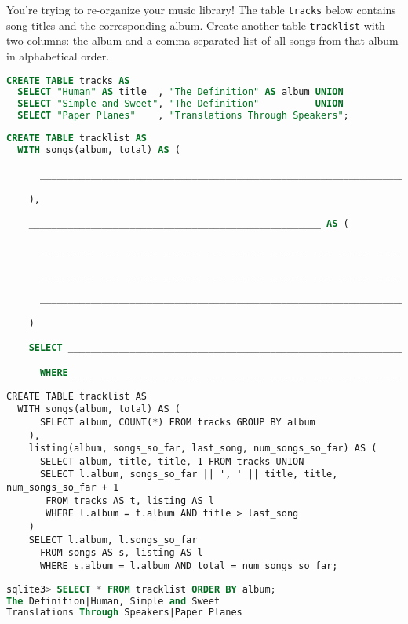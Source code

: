 \question You're trying to re-organize your music library! The table
\texttt{tracks} below contains song titles and the corresponding album.
Create another table \texttt{tracklist} with two columns: the album and a
comma-separated list of all songs from that album in alphabetical order.

\medskip

\begin{lstlisting}[language=SQL]
CREATE TABLE tracks AS
  SELECT "Human" AS title  , "The Definition" AS album UNION
  SELECT "Simple and Sweet", "The Definition"          UNION
  SELECT "Paper Planes"    , "Translations Through Speakers";
\end{lstlisting}

\medskip

\begin{lstlisting}[language=SQL]
CREATE TABLE tracklist AS
  WITH songs(album, total) AS (

      ____________________________________________________________________________

    ),

    ____________________________________________________ AS (

      ____________________________________________________________________________

      ____________________________________________________________________________

      ____________________________________________________________________________

    )

    SELECT _______________________________________________________________________

      WHERE ______________________________________________________________________;
\end{lstlisting}

\begin{solution}
\begin{lstlisting}
CREATE TABLE tracklist AS
  WITH songs(album, total) AS (
      SELECT album, COUNT(*) FROM tracks GROUP BY album
    ),
    listing(album, songs_so_far, last_song, num_songs_so_far) AS (
      SELECT album, title, title, 1 FROM tracks UNION
      SELECT l.album, songs_so_far || ', ' || title, title, num_songs_so_far + 1
       FROM tracks AS t, listing AS l
       WHERE l.album = t.album AND title > last_song
    )
    SELECT l.album, l.songs_so_far
      FROM songs AS s, listing AS l
      WHERE s.album = l.album AND total = num_songs_so_far;
\end{lstlisting}
\end{solution}

\medskip

\begin{lstlisting}[language=SQL]
sqlite3> SELECT * FROM tracklist ORDER BY album;
The Definition|Human, Simple and Sweet
Translations Through Speakers|Paper Planes
\end{lstlisting}
